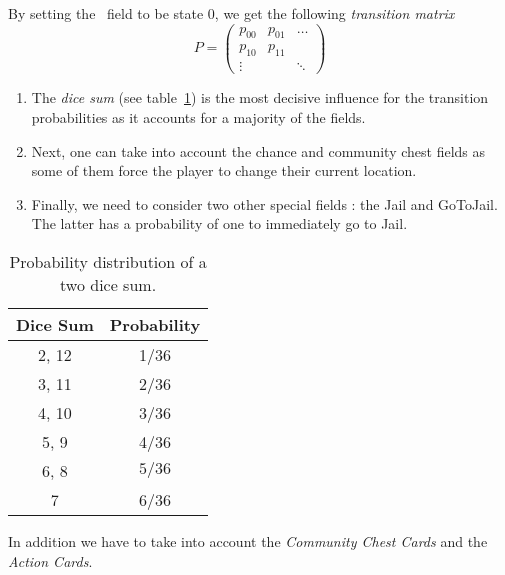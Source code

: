 By setting the \go~field to be state 0, we get the following \emph{transition matrix}
\[
  P = \begin{pmatrix}
    p_{00} & p_{01} & \dots \\
    p_{10} & p_{11} &  \\
    \vdots      &  & \ddots
  \end{pmatrix}
\]

\begin{enumerate}
  \item The \emph{dice sum} (see table~\ref{tab:dice_sum_prob}) is the 
  most decisive influence for the transition probabilities
  as it accounts for a majority of the fields.
  \item Next, one can take into account the chance and community chest
  fields as some of them force the player to change their current location.
  \item Finally, we need to consider two other special fields :
  the Jail and GoToJail. The latter has a probability
  of one to immediately go to Jail.
\end{enumerate}

\begin{table}
  \begin{center}
    \begin{tabular}{|c|c|}
      \hline
        \textbf{Dice Sum} & \textbf{Probability} \\
        \hline \hline
        2, 12 & 1/36 \\
        \hline
        3, 11 & 2/36 \\
        \hline
        4, 10 & 3/36 \\
        \hline
        5, 9 & 4/36 \\
        \hline
        6, 8 & $5/36$ \\
        \hline
        7 & 6/36 \\
      \hline
    \end{tabular}
  \end{center}
  \caption{Probability distribution of a two dice sum.}
  \label{tab:dice_sum_prob}
\end{table}

In addition we have to take into account the \emph{Community Chest Cards} and 
the \emph{Action Cards}. 

